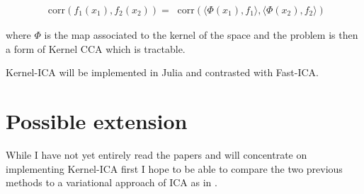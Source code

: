 \documentclass[11pt]{article}
\newcommand*\corr{\mathop{}\!\mathrm{corr}}
\begin{document}
\begin{align*}
	\corr(f_1(x_1), f_2(x_2)) = \corr \left( \langle \Phi (x_1), f_1 \rangle, \langle \Phi (x_2), f_2 \rangle \right)
\end{align*}

where $\Phi$ is the map associated to the kernel of the space and the problem is then a form of Kernel CCA which is tractable.

Kernel-ICA will be implemented in Julia and contrasted with Fast-ICA.

\section{Possible extension}

While I have not yet entirely read the papers and will concentrate on implementing Kernel-ICA first I hope to be able to compare the two previous methods to a variational approach of ICA as in \cite{Lawrence2000, Winther2007, Choudrey2002}.

\printbibliography
\end{document}
